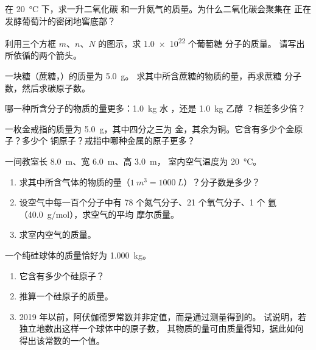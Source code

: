 \begin{exercise}[$\star\star$]\label{exo:g10:the-mole:8}
在 \qty{20}{\celsius} 下，求一升二氧化碳
和一升氮气的质量。为什么二氧化碳会聚集在
正在发酵葡萄汁的密闭地窖底部？
\end{exercise}

\begin{exercise}[$\star\star$]\label{exo:g10:the-mole:9}
利用三个方框 $m$、$n$、$N$ 的图示，求
\num{1.0e22} 个葡萄糖  分子的质量。
请写出所依循的两个箭头。
\end{exercise}

\begin{exercise}[$\star\star$]\label{exo:g10:the-mole:10}
一块糖（蔗糖，）的质量为 \qty{5.0}{g}。
求其中所含蔗糖的物质的量，再求蔗糖
分子数，然后求碳原子数。
\end{exercise}

\begin{exercise}[$\star\star$]\label{exo:g10:the-mole:11}
哪一种所含分子的物质的量更多：\qty{1.0}{kg} 水
，还是 \qty{1.0}{kg} 乙醇 ？相差多少倍？
\end{exercise}

\begin{exercise}[$\star\star\star$]\label{exo:g10:the-mole:12}
一枚金戒指的质量为 \qty{5.0}{g}，其中四分之三为
金，其余为铜。它含有多少个金原子？多少个
铜原子？戒指中哪种金属的原子更多？
\end{exercise}

\begin{exercise}[$\star\star\star$]\label{exo:g10:the-mole:13}
一间教室长 \qty{8.0}{m}、宽 \qty{6.0}{m}、高 \qty{3.0}{m}，
室内空气温度为 \qty{20}{\celsius}。
\begin{enumerate}
  \item 求其中所含气体的物质的量（$\qty{1}{m^3} =
        \qty{1000}{L}$）？分子数是多少？
  \item 设空气中每一百个分子中有 78 个氮气分子、21 个氧气分子、1 个
        氩（\qty{40.0}{g/mol}），求空气的平均
        摩尔质量。
  \item 求室内空气的质量。
\end{enumerate}
\end{exercise}

\begin{exercise}[$\star\star\star$]\label{exo:g10:the-mole:14}
一个纯硅球体的质量恰好为 \qty{1.000}{kg}。
\begin{enumerate}
  \item 它含有多少个硅原子？
  \item 推算一个硅原子的质量。
  \item 2019 年以前，阿伏伽德罗常数并非定值，而是通过测量得到的。
        试说明，若独立地数出这样一个球体中的原子数，
        其物质的量可由质量得知，据此如何得出该常数的一个值。
\end{enumerate}
\end{exercise}

